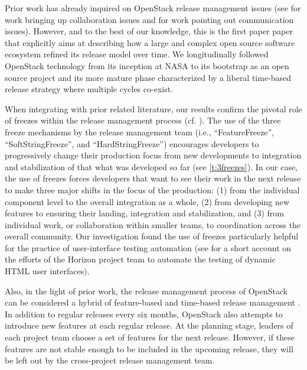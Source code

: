 \documentclass[dvipsnames]{interact}
\theoremstyle{plain}\newtheorem{theorem}{Theorem}[section]
\theoremstyle{definition}
\theoremstyle{remark}
\begin{document}
Prior work has already inquired on OpenStack release management issues (see \citep[pp 10-11]{Teixeira_et_al2015} for work bringing up collaboration issues and \citep[pp 80-82]{PooCaamano2016} for work pointing out communication issues). However, and to the best of our knowledge, this is the first paper paper that explicitly aims at describing how a large and complex open source software ecosystem refined its release model over time. We longitudinally followed OpenStack technology from its inception at NASA to its bootstrap as an open source project and its more mature phase characterized by a liberal time-based release strategy where multiple cycles co-exist.




When integrating with prior related literature, our results confirm the pivotal role of freezes within the release management process (cf. \citep{Fitzgerald2011,AnandBhatt_et_al2017}).
The use of the three freeze mechanisms by the release management team (i.e., “FeatureFreeze”, “SoftStringFreeze”,  and “HardStringFreeze”) encourages developers to progressively change their production focus from new developments to integration and stabilization of that what was developed so far (see \cref{t:3freezes}). 
In our case, the use of freezes forces developers that want to see their work in the next release to make three major shifts in the focus of the production: (1)  from the individual component level to the overall integration as a whole, (2) from developing new features to ensuring their landing, integration and stabilization, and (3) from individual work, or collaboration within smaller teams, to coordination across the overall community. Our investigation found the use of freezes particularly helpful for the practice of user-interface testing automation (see  for a short account on the efforts of the Horizon project team to automate the testing of dynamic HTML user interfaces). 





Also, in the light of prior work, the  release management process of OpenStack can be considered a hybrid of feature-based and time-based release management \citep[pp 23]{Wright2012}. In addition to regular releases every six months, OpenStack also attempts to introduce new features at each regular release. At the planning stage, leaders of each project team choose a set of features  for the  next release. However, if these features are not stable enough to be included in the upcoming release, they will be left out by the cross-project release management team. 
\end{document}
